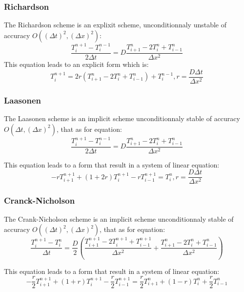 \documentclass [10 pt, a4 paper]{article}
\begin{document}
\subsubsection{Richardson}
The Richardson scheme is an explixit scheme, unconditionnaly unstable of accuracy $O((\Delta t)^{2},( \Delta x)^{2})$:
\begin{equation}
    \frac{T_{i}^{n+1} - T_{i}^{n-1}}{2\Delta t} = D \frac{T_{i+1}^{n} - 2 T_{i}^{n} + T_{i-1}^{n}}{\Delta x^{2}}
\end{equation}
This equation leads to an explicit form which is:
\begin{equation}
    T_{i}^{n+1} = 2r(T_{i+1}^{n} - 2T_{i}^{n} + T_{i-1}^{n}) + T_{i}^{n-1}, r=\frac{D\Delta t}{\Delta x^{2}}
\end{equation}

\subsubsection{Laasonen}
The Laasonen scheme is an implicit scheme unconditionnaly stable of accuracy $O(\Delta t, (\Delta x)^{2})$,
that as for equation:
\begin{equation}
    \frac{T_{i}^{n+1} - T_{i}^{n-1}}{2\Delta t} = D\frac{T_{i+1}^{n} - 2T_{i}^{n} + T_{i-1}^{n}}{\Delta x^{2}}
\end{equation}

This equation leads to a form that result in a system of linear equation:
\begin{equation}
    -r T_{i+1}^{n+1} + (1+2r)T_{i}^{n+1} -rT_{i-1}^{n+1} =T_{i}^{n}, r=\frac{D\Delta t}{\Delta x^{2}}
\end{equation}

\subsubsection{Cranck-Nicholson}
The Crank-Nicholson scheme is an implicit scheme unconditionnaly stable of accuracy $O((\Delta t)^{2}, (\Delta x)^{2})$, that as for equation:
\begin{equation} 
    \frac{T_{i}^{n+1} - T_{i}^{n}}{\Delta t} = \frac{D}{2}(\frac{T_{i+1}^{n+1}-2T_{i}^{n+1}+T_{i-1}^{n+1}}{\Delta x^{2}} + \frac{T_{i+1}^{n}-2T_{i}^{n}+T_{i-1}^{n}}{\Delta x^{2}})
\end{equation}

This equation leads to a form that result in a system of linear equation:
\begin{equation}
    -\frac{r}{2} T_{i+1}^{n+1}+(1+r)T_{i}^{n+1}-\frac{r}{2}T_{i-1}^{n+1} = \frac{r}{2}T_{i+1}^{n} + (1-r)T_{i}^{n} + \frac{r}{2}T_{i-1}^{n}
\end{equation}
\quad
\end{document}
